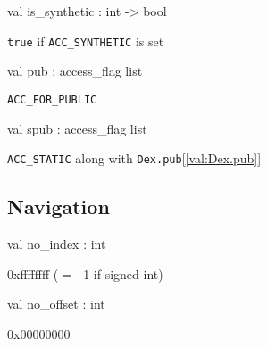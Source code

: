 \documentclass[11pt]{article}
\begin{document}
\label{val:Dex.is-underscoresynthetic}\begin{ocamldoccode}
val is_synthetic : int -> bool
\end{ocamldoccode}
\begin{ocamldocdescription}
{\tt{true}} if {\tt{ACC\_SYNTHETIC}} is set


\end{ocamldocdescription}




\label{val:Dex.pub}\begin{ocamldoccode}
val pub : access_flag list
\end{ocamldoccode}
\begin{ocamldocdescription}
{\tt{ACC\_FOR\_PUBLIC}}


\end{ocamldocdescription}




\label{val:Dex.spub}\begin{ocamldoccode}
val spub : access_flag list
\end{ocamldoccode}
\begin{ocamldocdescription}
{\tt{ACC\_STATIC}} along with {\tt{Dex.pub}}[\ref{val:Dex.pub}]


\end{ocamldocdescription}




\subsection{Navigation}




\label{val:Dex.no-underscoreindex}\begin{ocamldoccode}
val no_index : int
\end{ocamldoccode}
\begin{ocamldocdescription}
0xffffffff ($=$ -1 if signed int)


\end{ocamldocdescription}




\label{val:Dex.no-underscoreoffset}\begin{ocamldoccode}
val no_offset : int
\end{ocamldoccode}
\begin{ocamldocdescription}
0x00000000


\end{ocamldocdescription}
\end{document}
